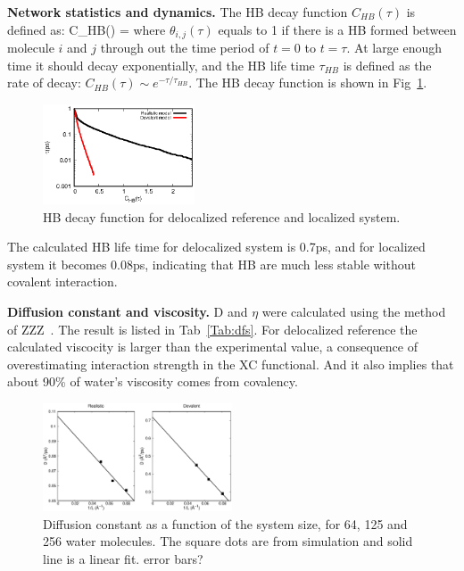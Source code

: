 \documentclass[aps,prl,reprint,amsmath,amssymb]{revtex4-1}
\begin{document}
\textbf{Network statistics and dynamics.} The HB decay function $C_{HB}(\tau)$ is defined as:
\bea
C_{HB}(\tau) =  \label{Eq:HBdecay}
\eea
where $\theta_{i,j}(\tau)$ equals to 1 if there is a HB formed between molecule $i$ and $j$ through out the time period of $t=0$ to $t=\tau$. At large enough time it should decay exponentially, and the HB life time $\tau_{HB}$ is defined as the rate of decay: $C_{HB}(\tau) \sim e^{-\tau/\tau_{HB}}$. The HB decay function is shown in Fig~\ref{Fig:HBdecay}.

\begin{figure}
\includegraphics[width=0.4\textwidth]{new_hbdecay}
\caption{HB decay function for delocalized reference and localized system.} \label{Fig:HBdecay}
\end{figure}

The calculated HB life time for delocalized system is 0.7ps, and for localized system it becomes 0.08ps, indicating that HB are much less stable without covalent interaction. 
 
 
\textbf{Diffusion constant and viscosity.} D and $\eta$ were calculated using the method of ZZZ~\cite{dunweg1993molecular}. The result is listed in Tab~\ref{Tab:dfs}. For delocalized reference the calculated viscocity is larger than the experimental value, a consequence of overestimating interaction strength in the XC functional. And it also implies that about 90\% of water's viscosity comes from covalency.

\begin{figure}
\includegraphics[width=0.5\textwidth]{msd}
\caption{Diffusion constant as a function of the system size, for 64, 125 and 256 water molecules. The square dots are from simulation and solid line is a linear fit. \new error bars?\old }\label{Fig:dfs}
\end{figure} 
\end{document}
